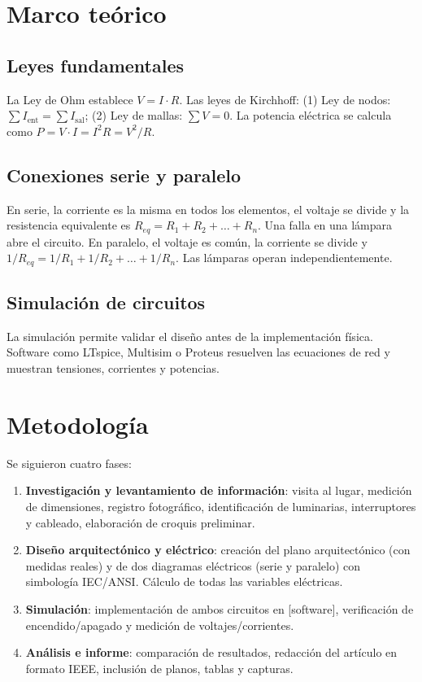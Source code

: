 \section{Marco teórico}
\subsection{Leyes fundamentales}
La Ley de Ohm establece \( V = I \cdot R \). Las leyes de Kirchhoff: (1) Ley de nodos: \(\sum I_{\text{ent}} = \sum I_{\text{sal}}\); (2) Ley de mallas: \(\sum V = 0\). La potencia eléctrica se calcula como \( P = V \cdot I = I^2 R = V^2 / R \).

\subsection{Conexiones serie y paralelo}
En serie, la corriente es la misma en todos los elementos, el voltaje se divide y la resistencia equivalente es \( R_{eq} = R_1 + R_2 + \dots + R_n \). Una falla en una lámpara abre el circuito. En paralelo, el voltaje es común, la corriente se divide y \( 1/R_{eq} = 1/R_1 + 1/R_2 + \dots + 1/R_n \). Las lámparas operan independientemente.

\subsection{Simulación de circuitos}
La simulación permite validar el diseño antes de la implementación física. Software como LTspice, Multisim o Proteus resuelven las ecuaciones de red y muestran tensiones, corrientes y potencias.

\section{Metodología}
Se siguieron cuatro fases:
\begin{enumerate}
    \item \textbf{Investigación y levantamiento de información}: visita al lugar, medición de dimensiones, registro fotográfico, identificación de luminarias, interruptores y cableado, elaboración de croquis preliminar.
    \item \textbf{Diseño arquitectónico y eléctrico}: creación del plano arquitectónico (con medidas reales) y de dos diagramas eléctricos (serie y paralelo) con simbología IEC/ANSI. Cálculo de todas las variables eléctricas.
    \item \textbf{Simulación}: implementación de ambos circuitos en [software], verificación de encendido/apagado y medición de voltajes/corrientes.
    \item \textbf{Análisis e informe}: comparación de resultados, redacción del artículo en formato IEEE, inclusión de planos, tablas y capturas.
\end{enumerate}

